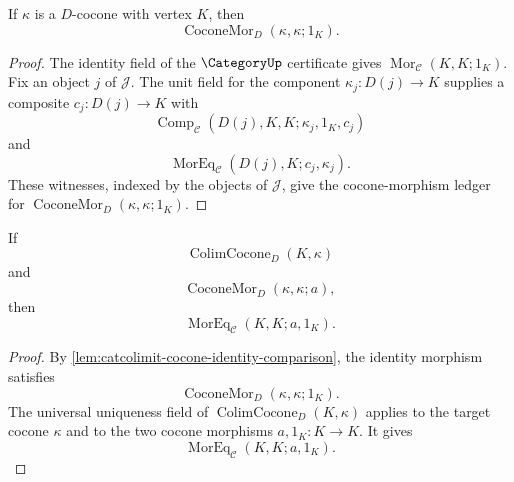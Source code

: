 \begin{lemma}\label{lem:catcolimit-cocone-identity-comparison}
If $\kappa$ is a $D$-cocone with vertex $K$, then
$$
\operatorname{CoconeMor}_{D}(\kappa,\kappa;1_K).
$$
\end{lemma}
\begin{proof}
The identity field of the $\CategoryUp$ certificate gives $\operatorname{Mor}_{\mathcal C}(K,K;1_K)$. Fix an object $j$ of $\mathcal J$. The unit field for the component $\kappa_j:D(j)\to K$ supplies a composite $c_j:D(j)\to K$ with
$$
\operatorname{Comp}_{\mathcal C}(D(j),K,K;\kappa_j,1_K,c_j)
$$
and
$$
\operatorname{MorEq}_{\mathcal C}(D(j),K;c_j,\kappa_j).
$$
These witnesses, indexed by the objects of $\mathcal J$, give the cocone-morphism ledger for $\operatorname{CoconeMor}_{D}(\kappa,\kappa;1_K)$.
\end{proof}

\begin{proposition}\label{prop:catcolimit-colimiting-cocone-endomorphism-rigidity}
If
$$
\operatorname{ColimCocone}_{D}(K,\kappa)
$$
and
$$
\operatorname{CoconeMor}_{D}(\kappa,\kappa;a),
$$
then
$$
\operatorname{MorEq}_{\mathcal C}(K,K;a,1_K).
$$
\end{proposition}
\begin{proof}
By \autoref{lem:catcolimit-cocone-identity-comparison}, the identity morphism satisfies
$$
\operatorname{CoconeMor}_{D}(\kappa,\kappa;1_K).
$$
The universal uniqueness field of $\operatorname{ColimCocone}_{D}(K,\kappa)$ applies to the target cocone $\kappa$ and to the two cocone morphisms $a,1_K:K\to K$. It gives
$$
\operatorname{MorEq}_{\mathcal C}(K,K;a,1_K).
$$
\end{proof}

